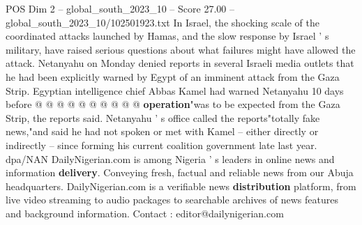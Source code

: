 \begin{textsample}{POS Dim 2 – global\_south\_2023\_10 – Score 27.00 – global\_south\_2023\_10/102501923.txt}
In Israel, the shocking scale of the coordinated attacks launched by Hamas, and the slow response by Israel ' s military, have raised serious questions about what failures might have allowed the attack.
Netanyahu on Monday denied reports in several Israeli media outlets that he had been explicitly warned by Egypt of an imminent attack from the Gaza Strip.
Egyptian intelligence chief Abbas Kamel had warned Netanyahu 10 days before @ @ @ @ @ @ @ @ @ @ \textbf{operation}"was to be expected from the Gaza Strip, the reports said.
Netanyahu ' s office called the reports"totally fake news,"and said he had not spoken or met with Kamel -- either directly or indirectly -- since forming his current coalition government late last year. dpa/NAN DailyNigerian.com is among Nigeria ' s leaders in online news and information \textbf{delivery}.
Conveying fresh, factual and reliable news from our Abuja headquarters.
DailyNigerian.com is a verifiable news \textbf{distribution} platform, from live video streaming to audio packages to searchable archives of news features and background information.
Contact : editor@dailynigerian.com

\end{textsample}
